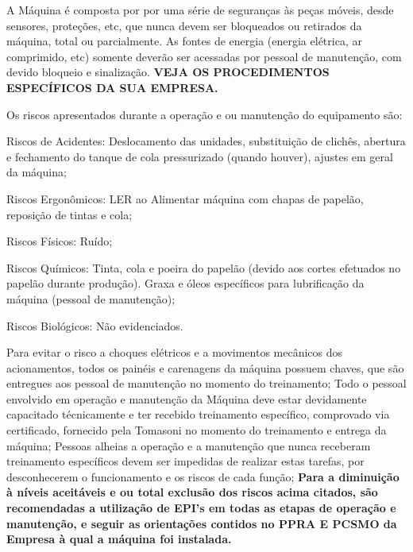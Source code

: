 A Máquina é composta por por uma série de seguranças às peças móveis, desde sensores, proteções, etc, que nunca devem
ser bloqueados ou retirados da máquina, total ou parcialmente. As fontes de energia (energia elétrica, ar comprimido, etc)
somente deverão ser acessadas por pessoal de manutenção, com devido bloqueio e sinalização.
\textbf{VEJA OS PROCEDIMENTOS ESPECÍFICOS DA SUA EMPRESA.}

Os riscos apresentados durante a operação e ou manutenção do equipamento são:



\begin{typeOfRisks}
\item[\ding{\dingNumber}] Riscos de Acidentes: Deslocamento das unidades, substituição de clichês, abertura e fechamento do tanque de cola pressurizado (quando houver), ajustes em geral da máquina;
\item[\ding{\dingNumber}] Riscos Ergonômicos: LER ao Alimentar máquina com chapas de papelão, reposição de tintas e cola;
\item[\ding{\dingNumber}] Riscos Físicos: Ruído;
\item[\ding{\dingNumber}] Riscos Químicos: Tinta, cola e poeira do papelão (devido aos cortes efetuados no papelão durante produção). Graxa e
óleos específicos para lubrificação da máquina (pessoal de manutenção);
\item[\ding{\dingNumber}] Riscos Biológicos: Não evidenciados.
\end{typeOfRisks}
Para evitar o risco a choques elétricos e a movimentos mecânicos dos acionamentos, todos os painéis e carenagens da
máquina possuem chaves, que são entregues aos pessoal de manutenção no momento do treinamento;
Todo o pessoal envolvido em operação e manutenção da Máquina deve estar devidamente capacitado técnicamente e ter
recebido treinamento específico, comprovado via certificado, fornecido pela Tomasoni no momento do treinamento e
entrega da máquina;
Pessoas alheias a operação e a manutenção que nunca receberam treinamento específicos devem ser impedidas de
realizar estas tarefas, por desconhecerem o funcionamento e os riscos de cada função;
\textbf{Para a diminuição à níveis aceitáveis e ou total exclusão dos riscos acima citados, são recomendadas a utilização de EPI's
em todas as etapas de operação e manutenção, e seguir as orientações contidos no PPRA E PCSMO da Empresa à qual a
máquina foi instalada.}

